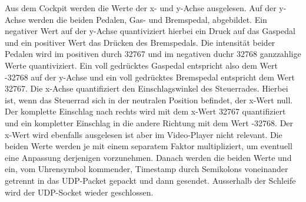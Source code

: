 Aus dem Cockpit werden die Werte der x- und y-Achse ausgelesen. Auf der y-Achse werden die beiden Pedalen, Gas- und Bremspedal, abgebildet. Ein negativer Wert auf der y-Achse quantiviziert hierbei ein Druck auf das Gaspedal und ein positiver Wert das Drücken des Bremspedals. Die intensität beider Pedalen wird im positiven durch 32767 und im negativen duchr 32768 ganzzahlige Werte quantiviziert. Ein voll gedrücktes Gaspedal entspricht also dem Wert -32768 auf der y-Achse und ein voll gedrücktes Bremspedal entspricht dem Wert 32767. Die x-Achse quantifiziert den Einschlagswinkel des Steuerrades. Hierbei ist, wenn das Steuerrad sich in der neutralen Position befindet, der x-Wert null. Der komplette Einschlag nach rechts wird mit dem x-Wert 32767 quantifiziert und ein kompletter Einschlag in die andere Richtung mit dem Wert -32768. Der x-Wert wird ebenfalls ausgelesen ist aber im Video-Player nicht relevant. Die beiden Werte werden je mit einem separatem Faktor multipliziert, um eventuell eine Anpassung derjenigen vorzunehmen. Danach werden die beiden Werte und ein, vom Uhrensymbol kommender, Timestamp durch Semikolons voneinander getrennt in das UDP-Packet gepackt und dann gesendet. Ausserhalb der Schleife wird der UDP-Socket wieder geschlossen.

